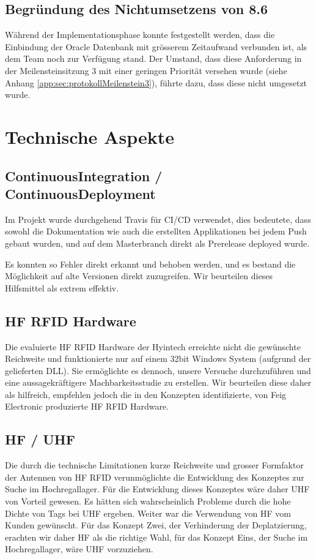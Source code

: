 \subsection{Begründung des Nichtumsetzens von 8.6}
Während der Implementationsphase konnte festgestellt werden, dass die Einbindung der Oracle Datenbank mit grösserem Zeitaufwand verbunden ist, als dem Team noch zur Verfügung stand. Der Umstand, dass diese Anforderung in der Meilensteinsitzung 3 mit einer geringen Priorität versehen wurde (siehe Anhang \ref{app:sec:protokollMeilenstein3}), führte dazu, dass diese nicht umgesetzt wurde.

\section{Technische Aspekte}
\subsection{ContinuousIntegration / ContinuousDeployment}
Im Projekt wurde durchgehend Travis für CI/CD verwendet, dies bedeutete, dass sowohl die Dokumentation wie auch die erstellten Applikationen bei jedem Push gebaut wurden, und auf dem Masterbranch direkt als Prerelease deployed wurde.

Es konnten so Fehler direkt erkannt und behoben werden, und es bestand die Möglichkeit auf alte Versionen direkt zuzugreifen. Wir beurteilen dieses Hilfsmittel als extrem effektiv.

\subsection{\gls{HF} \gls{RFID} Hardware}
Die evaluierte \gls{HF} \gls{RFID} Hardware der Hyintech erreichte nicht die gewünschte Reichweite und funktionierte nur auf einem 32bit Windows System (aufgrund der gelieferten DLL). Sie ermöglichte es dennoch, unsere Versuche durchzuführen und eine aussagekräftigere Machbarkeitsstudie zu erstellen. Wir beurteilen diese daher als hilfreich, empfehlen jedoch die in den Konzepten identifizierte, von Feig Electronic produzierte \gls{HF} \gls{RFID} Hardware.

\subsection{\gls{HF} / \gls{UHF}}
Die durch die technische Limitationen kurze Reichweite und grosser Formfaktor der Antennen von \gls{HF} \gls{RFID} verunmöglichte die Entwicklung des Konzeptes zur Suche im Hochregallager. Für die Entwicklung dieses Konzeptes wäre daher \gls{UHF} von Vorteil gewesen. Es hätten sich wahrscheinlich Probleme durch die hohe Dichte von Tags bei \gls{UHF} ergeben. Weiter war die Verwendung von \gls{HF} vom Kunden gewünscht. Für das Konzept Zwei, der Verhinderung der Deplatzierung, erachten wir daher \gls{HF} als die richtige Wahl, für das Konzept Eins, der Suche im Hochregallager, wäre \gls{UHF} vorzuziehen.

